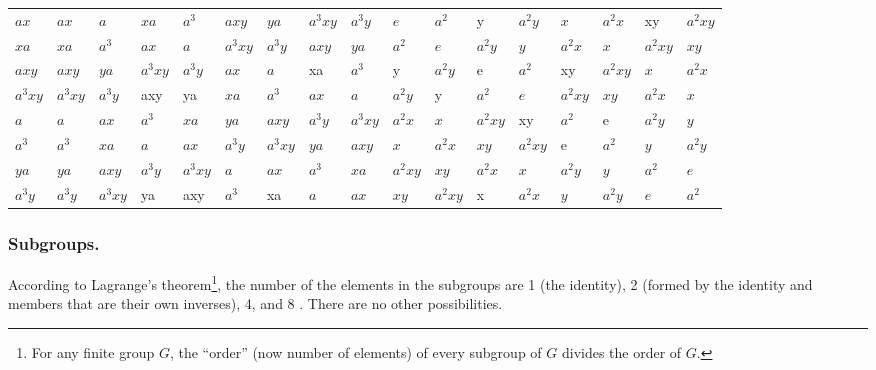 {\begin{table}[h]
\begin{minipage}{\textwidth}
\begin{tabular}{l|llllllllllllllll}
$ax$       & $ax$       & $a$        & $xa$ & $a^{3}$ & $axy$ & $ya$ & $a^{3}xy$ & $a^{3}y$ & $e$ & $a^{2}$ & y & $a^{2}y$ & $x$ & $a^{2}x$ & xy & $a^{2}xy$ \\
$xa$       & $xa$       & $a^{3}$        & $ax$ & $a$ & $a^{3}xy$ & $a^{3}y$ & $axy$ & $ya$ & $a^{2}$ & $e$ & $a^{2}y$ & $y$ & $a^{2}x$ & $x$ & $a^{2}xy$ & $xy$ \\
$axy$      & $axy$      & $ya$        & $a^{3}xy$ & $a^{3}y$ & $ax$ & $a$ & xa & $a^{3}$ & y & $a^{2}y$ & e & $a^{2}$ & xy & $a^{2}xy$ & $x$ & $a^{2}x$ \\
$a^{3}xy$& $a^{3}xy$& $a^{3}y$        & axy & ya & $xa$ & $a^{3}$ & $ax$ & $a$ & $a^{2}y$ & y & $a^{2}$ & $e$ & $a^{2}xy$ & $xy$ & $a^{2}x$ & $x$ \\
$a$        & $a$        & $ax$        & $a^{3}$ & $xa$ & $ya$ & $axy$ & $a^{3}y$ & $a^{3}xy$ & $a^{2}x$ & $x$ & $a^{2}xy$ & xy & $a^{2}$ & e & $a^{2}y$ & $y$ \\
$a^{3}$  & $a^{3}$  & $xa$        & $a$ & $ax$ & $a^{3}y$ & $a^{3}xy$ & $ya$ & $axy$ & $x$ & $a^{2}x$ & $xy$ & $a^{2}xy$ & e & $a^{2}$ & $y$ & $a^{2}y$ \\
$ya$       & $ya$       & $axy$ & $a^{3}y$ & $a^{3}xy$ & $a$ & $ax$ & $a^{3}$ & $xa$ & $a^{2}xy$ & $xy$ & $a^{2}x$ & $x$ & $a^{2}y$ & $y$ & $a^{2}$ & $e$ \\
$a^{3}y$ &$a^{3}y$  & $a^{3}xy$ & ya & axy & $a^{3}$ & xa & $a$ & $ax$ & $xy$ & $a^{2}xy$ & x & $a^{2}x$ & $y$ & $a^{2}y$ & $e$ & $a^{2}$\\
\end{tabular}
\end{minipage} %
%
\end{table}



\subsubsection{Subgroups.}
%
According to  Lagrange's theorem\footnote{For any finite group $G$, the ``order'' (now number of elements) of every subgroup of $G$ divides the order of $G$.},  the number of the elements in the subgroups are 1 (the identity), 2 (formed by the identity and members that are their own inverses), 4, and 8 \cite{Zee2016}. There are no other possibilities.

}
